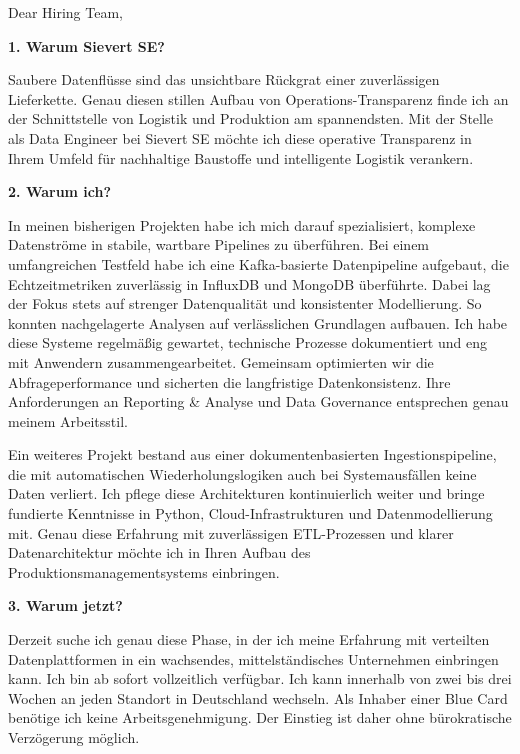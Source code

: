 \documentclass[11pt,a4paper]{coverletter}
\begin{document}

\opening{Dear Hiring Team,}

\vspace{8pt}\noindent\textbf{1. Warum Sievert SE?}\par\vspace{3pt}

Saubere Datenflüsse sind das unsichtbare Rückgrat einer zuverlässigen Lieferkette. Genau diesen stillen Aufbau von Operations-Transparenz finde ich an der Schnittstelle von Logistik und Produktion am spannendsten. Mit der Stelle als Data Engineer bei Sievert SE möchte ich diese operative Transparenz in Ihrem Umfeld für nachhaltige Baustoffe und intelligente Logistik verankern.

\vspace{8pt}\noindent\textbf{2. Warum ich?}\par\vspace{3pt}

In meinen bisherigen Projekten habe ich mich darauf spezialisiert, komplexe Datenströme in stabile, wartbare Pipelines zu überführen. Bei einem umfangreichen Testfeld habe ich eine Kafka-basierte Datenpipeline aufgebaut, die Echtzeitmetriken zuverlässig in InfluxDB und MongoDB überführte. Dabei lag der Fokus stets auf strenger Datenqualität und konsistenter Modellierung. So konnten nachgelagerte Analysen auf verlässlichen Grundlagen aufbauen. Ich habe diese Systeme regelmäßig gewartet, technische Prozesse dokumentiert und eng mit Anwendern zusammengearbeitet. Gemeinsam optimierten wir die Abfrageperformance und sicherten die langfristige Datenkonsistenz. Ihre Anforderungen an Reporting \& Analyse und Data Governance entsprechen genau meinem Arbeitsstil.

Ein weiteres Projekt bestand aus einer dokumentenbasierten Ingestionspipeline, die mit automatischen Wiederholungslogiken auch bei Systemausfällen keine Daten verliert. Ich pflege diese Architekturen kontinuierlich weiter und bringe fundierte Kenntnisse in Python, Cloud-Infrastrukturen und Datenmodellierung mit. Genau diese Erfahrung mit zuverlässigen ETL-Prozessen und klarer Datenarchitektur möchte ich in Ihren Aufbau des Produktionsmanagementsystems einbringen.

\vspace{8pt}\noindent\textbf{3. Warum jetzt?}\par\vspace{3pt}

Derzeit suche ich genau diese Phase, in der ich meine Erfahrung mit verteilten Datenplattformen in ein wachsendes, mittelständisches Unternehmen einbringen kann. Ich bin ab sofort vollzeitlich verfügbar. Ich kann innerhalb von zwei bis drei Wochen an jeden Standort in Deutschland wechseln. Als Inhaber einer Blue Card benötige ich keine Arbeitsgenehmigung. Der Einstieg ist daher ohne bürokratische Verzögerung möglich.
\end{document}
